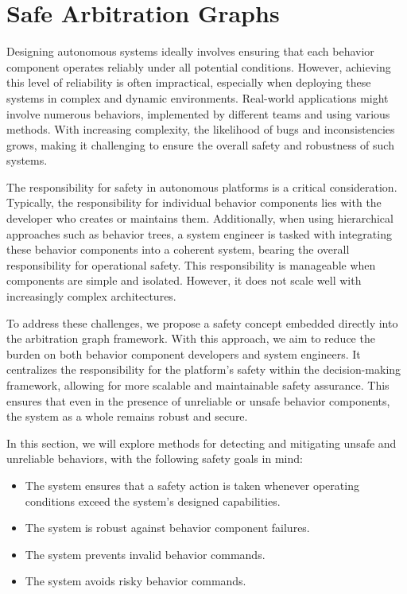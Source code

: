 \section{Safe Arbitration Graphs}

Designing autonomous systems ideally involves ensuring that each behavior component operates reliably under all potential conditions.
However, achieving this level of reliability is often impractical, especially when deploying these systems in complex and dynamic environments.
Real-world applications might involve numerous behaviors, implemented by different teams and using various methods.
With increasing complexity, the likelihood of bugs and inconsistencies grows, making it challenging to ensure the overall safety and robustness of such systems.

The responsibility for safety in autonomous platforms is a critical consideration.
Typically, the responsibility for individual behavior components lies with the developer who creates or maintains them.
Additionally, when using hierarchical approaches such as behavior trees,
    a system engineer is tasked with integrating these behavior components into a coherent system,
    bearing the overall responsibility for operational safety.
This responsibility is manageable when components are simple and isolated.
However, it does not scale well with increasingly complex architectures.

To address these challenges, we propose a safety concept embedded directly into the arbitration graph framework.
With this approach, we aim to reduce the burden on both behavior component developers and system engineers.
It centralizes the responsibility for the platform's safety within the decision-making framework,
    allowing for more scalable and maintainable safety assurance.
This ensures that even in the presence of unreliable or unsafe behavior components, the system as a whole remains robust and secure.

In this section, we will explore methods for detecting and mitigating unsafe and unreliable behaviors, with the following safety goals in mind:

\begin{itemize}
    \item The system ensures that a safety action is taken whenever operating conditions exceed the system's designed capabilities.
    \item The system is robust against behavior component failures.
    \item The system prevents invalid behavior commands.
    \item The system avoids risky behavior commands.
\end{itemize}

